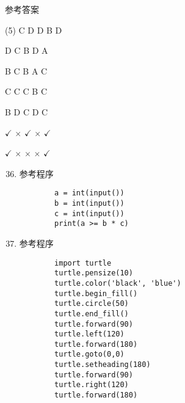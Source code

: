 \documentclass[11pt]{ctexart}
\begin{document}
\begin{center}
    \Huge \heiti 参考答案
\end{center}

    \begin{tasks}[label=\arabic*.](5)
        \task C
        \task D
        \task D
        \task B
        \task D

        \task D
        \task C
        \task B
        \task D
        \task A

        \task B
        \task C
        \task B
        \task A
        \task C

        \task C
        \task C
        \task C
        \task B
        \task C

        \task B
        \task D
        \task C
        \task D
        \task C

        \task $\checkmark$
        \task $\times$
        \task $\checkmark$
        \task $\times$
        \task $\checkmark$

        \task $\checkmark$
        \task $\times$
        \task $\times$
        \task $\times$
        \task $\checkmark$
    \end{tasks}

\begin{enumerate}
    \setcounter{enumi}{35}
    \item 参考程序
    \begin{lstlisting}
        a = int(input())
        b = int(input())
        c = int(input())
        print(a >= b * c)
    \end{lstlisting}

    \item 参考程序
    \begin{lstlisting}
        import turtle
        turtle.pensize(10)
        turtle.color('black', 'blue')
        turtle.begin_fill()
        turtle.circle(50)
        turtle.end_fill()
        turtle.forward(90)
        turtle.left(120)
        turtle.forward(180)
        turtle.goto(0,0)
        turtle.setheading(180)
        turtle.forward(90)
        turtle.right(120)
        turtle.forward(180)
    \end{lstlisting}
\end{enumerate}
\end{document}
